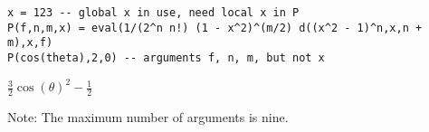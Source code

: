 \begin{enumerate}
\begin{Verbatim}[formatcom=\color{blue}]
x = 123 -- global x in use, need local x in P
P(f,n,m,x) = eval(1/(2^n n!) (1 - x^2)^(m/2) d((x^2 - 1)^n,x,n + m),x,f)
P(cos(theta),2,0) -- arguments f, n, m, but not x
\end{Verbatim}

\noindent
$\displaystyle \tfrac{3}{2} \cos(\theta)^2-\tfrac{1}{2}$

\bigskip
\noindent
Note: The maximum number of arguments is nine.

\end{enumerate}
